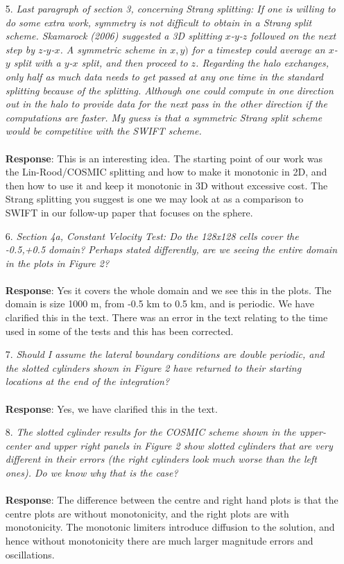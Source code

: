 \documentclass[11pt,a4paper]{article}
\begin{document}
\begin{enumerate}[leftmargin=*]
\item[5.] \textit{Last paragraph of section 3, concerning Strang splitting: If one is willing to do some extra work, symmetry is not difficult to obtain in a Strang split scheme. Skamarock (2006) suggested a 3D splitting $x$-$y$-$z$ followed on the next step by $z$-$y$-$x$. A symmetric scheme in $x, y)$ for a timestep could average
an $x$-$y$ split with a $y$-$x$ split, and then proceed to $z$. Regarding the halo exchanges, only half as much data needs to get passed at any one time in the standard splitting because of the splitting. Although one could compute in one direction out in the halo to provide data for the next pass in the other direction if the computations are faster. My guess is that a symmetric Strang split scheme would be competitive with the SWIFT scheme.} \\
\\
\textbf{Response}: This is an interesting idea. The starting point of our work was the Lin-Rood/COSMIC splitting and how to make it monotonic in 2D, and then how to use it and keep it monotonic in 3D without excessive cost. The Strang splitting you suggest is one we may look at as a comparison to SWIFT in our follow-up paper that focuses on the sphere.

\item[6.] \textit{Section 4a, Constant Velocity Test: Do the 128x128 cells cover the -0.5,+0.5 domain? Perhaps stated differently, are we seeing the entire domain in the plots in Figure 2?} \\
\\
\textbf{Response}: Yes it covers the whole domain and we see this in the plots. The domain is size 1000 m, from -0.5 km to 0.5 km, and is periodic. We have clarified this in the text. There was an error in the text relating to the time used in some of the tests and this has been corrected.

\item[7.] \textit{Should I assume the lateral boundary conditions are double periodic, and the slotted cylinders shown in Figure 2 have returned to their starting locations at the end of the integration?} \\
\\
\textbf{Response}: Yes, we have clarified this in the text.

\item[8.] \textit{The slotted cylinder results for the COSMIC scheme shown in the upper-center and upper right panels in Figure 2 show slotted cylinders that are very different in their errors (the right cylinders look much
worse than the left ones). Do we know why that is the case?} \\
\\
\textbf{Response}: The difference between the centre and right hand plots is that the centre plots are without monotonicity, and the right plots are with monotonicity. The monotonic limiters introduce diffusion to the solution, and hence without monotonicity there are much larger magnitude errors and oscillations.


\end{enumerate}
\end{document}
